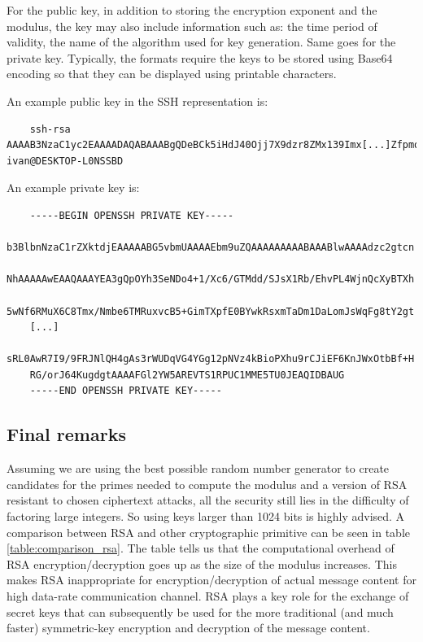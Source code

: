 For the public key, in addition to storing the encryption exponent and the modulus, the key may also include information such as: the time period of validity, the name of the algorithm used for key generation. Same goes for the private key. Typically, the formats require the keys to be stored using Base64 encoding so that they can be displayed using printable characters.

An example public key in the SSH representation is:
\begin{lstlisting}
	ssh-rsa AAAAB3NzaC1yc2EAAAADAQABAAABgQDeBCk5iHdJ40Ojj7X9dzr8ZMx139Imx[...]ZfpmoetXK04jj3s5RriUK6VF5weIhWbiLOeXAv39Vo56e1lO8HfhpD6/tZEztaibADaVc= ivan@DESKTOP-L0NSSBD
\end{lstlisting}


An example private key is:
\begin{lstlisting}
	-----BEGIN OPENSSH PRIVATE KEY-----
	b3BlbnNzaC1rZXktdjEAAAAABG5vbmUAAAAEbm9uZQAAAAAAAAABAAABlwAAAAdzc2gtcn
	NhAAAAAwEAAQAAAYEA3gQpOYh3SeNDo4+1/Xc6/GTMdd/SJsX1Rb/EhvPL4WjnQcXyBTXh
	5wNf6RMuX6C8Tmx/Nmbe6TMRuxvcB5+GimTXpfE0BYwkRsxmTaDm1DaLomJsWqFg8tY2gt
	[...]
	sRL0AwR7I9/9FRJNlQH4gAs3rWUDqVG4YGg12pNVz4kBioPXhu9rCJiEF6KnJWxOtbBf+H
	RG/orJ64KugdgtAAAAFGl2YW5AREVTS1RPUC1MME5TU0JEAQIDBAUG
	-----END OPENSSH PRIVATE KEY-----
\end{lstlisting}

\subsection{Final remarks}
Assuming we are using the best possible random number generator to create candidates for the primes needed to compute the modulus and a version of RSA resistant to chosen ciphertext attacks, all the security still lies in the difficulty of factoring large integers. So using keys larger than 1024 bits is highly advised. A comparison between RSA and other cryptographic primitive can be seen in table \ref{table:comparison_rsa}. The table tells us that the computational overhead of RSA encryption/decryption goes up as the size of the modulus increases. This makes RSA inappropriate for encryption/decryption of actual message content for high data-rate communication channel. RSA plays a key role for the exchange of secret keys that can subsequently be used for the more traditional (and much faster) symmetric-key encryption and decryption of the message content.


